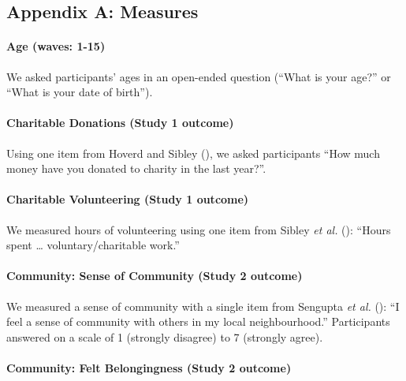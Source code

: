 \documentclass[
  single column]{article}
\let\oldparagraph\paragraph
\renewcommand{\paragraph}[1]{\oldparagraph{#1}\mbox{}}
\begin{document}
\subsection{Appendix A: Measures}\label{appendix-measures}

\paragraph{Age (waves: 1-15)}\label{age-waves-1-15}

We asked participants' ages in an open-ended question (``What is your
age?'' or ``What is your date of birth'').

\paragraph{Charitable Donations (Study 1
outcome)}\label{charitable-donations-study-1-outcome}

Using one item from Hoverd and Sibley
(), we asked participants
``How much money have you donated to charity in the last year?''.

\paragraph{Charitable Volunteering (Study 1
outcome)}\label{charitable-volunteering-study-1-outcome}

We measured hours of volunteering using one item from Sibley \emph{et
al.} (): ``Hours spent \ldots{}
voluntary/charitable work.''

\paragraph{Community: Sense of Community (Study 2
outcome)}\label{community-sense-of-community-study-2-outcome}

We measured a sense of community with a single item from Sengupta
\emph{et al.} (): ``I feel a sense of
community with others in my local neighbourhood.'' Participants answered
on a scale of 1 (strongly disagree) to 7 (strongly agree).

\paragraph{Community: Felt Belongingness (Study 2
outcome)}\label{community-felt-belongingness-study-2-outcome}
\end{document}

